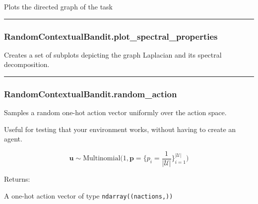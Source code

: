 Plots the directed graph of the task

\begin{center}\rule{0.5\linewidth}{\linethickness}\end{center}

\subsubsection{RandomContextualBandit.plot\_spectral\_properties}\label{randomcontextualbandit.plot_spectral_properties}

\begin{Shaded}
\begin{Highlighting}[]
\OperatorTok{=}\OperatorTok{=}\OperatorTok{=}\NormalTok{)}
\end{Highlighting}
\end{Shaded}

Creates a set of subplots depicting the graph Laplacian and its spectral
decomposition.

\begin{center}\rule{0.5\linewidth}{\linethickness}\end{center}

\subsubsection{RandomContextualBandit.random\_action}\label{randomcontextualbandit.random_action}

\begin{Shaded}
\begin{Highlighting}[]
\NormalTok{)}
\end{Highlighting}
\end{Shaded}

Samples a random one-hot action vector uniformly over the action space.

Useful for testing that your environment works, without having to create
an agent.

\[
\mathbf u \sim \mathrm{Multinomial}\Big(1, \mathbf p=\{p_i = \frac{1}{|\mathcal U|}\}_{i=1}^{|\mathcal U|}\Big)
\]

Returns:

A one-hot action vector of type \texttt{ndarray((nactions,))}

